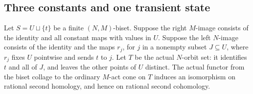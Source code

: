 \subsection{Three constants and one transient state}

\begin{proposition}\label{C:constant-core-one-transient-H2}
Let $S=U\sqcup\{t\}$ be a finite $(N,M)$-biset.  Suppose the
right $M$-image consists of the identity and all constant maps
with values in $U$.  Suppose the left $N$-image consists of the
identity and the maps $r_j$, for $j$ in a nonempty subset
$J\subseteq U$, where $r_j$ fixes $U$ pointwise and sends $t$ to
$j$.  Let $T$ be the actual $N$-orbit set: it identifies $t$ and
all of $J$, and leaves the other points of $U$ distinct.
The actual functor from the biset collage to the ordinary
$M$-act cone on $T$ induces an isomorphism on rational second
homology, and hence on rational second cohomology.
\end{proposition}
